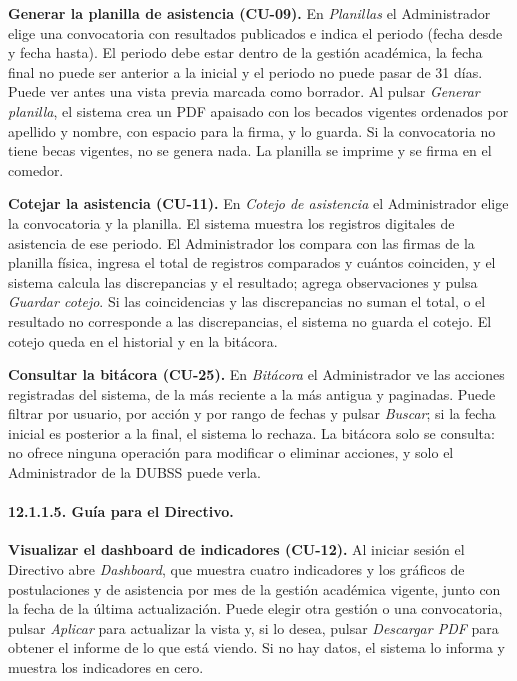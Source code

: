 \textbf{Generar la planilla de asistencia (CU-09).} En \textit{Planillas} el Administrador elige una convocatoria con resultados publicados e indica el periodo (fecha desde y fecha hasta). El periodo debe estar dentro de la gestión académica, la fecha final no puede ser anterior a la inicial y el periodo no puede pasar de 31 días. Puede ver antes una vista previa marcada como borrador. Al pulsar \textit{Generar planilla}, el sistema crea un PDF apaisado con los becados vigentes ordenados por apellido y nombre, con espacio para la firma, y lo guarda. Si la convocatoria no tiene becas vigentes, no se genera nada. La planilla se imprime y se firma en el comedor.\par

\textbf{Cotejar la asistencia (CU-11).} En \textit{Cotejo de asistencia} el Administrador elige la convocatoria y la planilla. El sistema muestra los registros digitales de asistencia de ese periodo. El Administrador los compara con las firmas de la planilla física, ingresa el total de registros comparados y cuántos coinciden, y el sistema calcula las discrepancias y el resultado; agrega observaciones y pulsa \textit{Guardar cotejo}. Si las coincidencias y las discrepancias no suman el total, o el resultado no corresponde a las discrepancias, el sistema no guarda el cotejo. El cotejo queda en el historial y en la bitácora.\par

\textbf{Consultar la bitácora (CU-25).} En \textit{Bitácora} el Administrador ve las acciones registradas del sistema, de la más reciente a la más antigua y paginadas. Puede filtrar por usuario, por acción y por rango de fechas y pulsar \textit{Buscar}; si la fecha inicial es posterior a la final, el sistema lo rechaza. La bitácora solo se consulta: no ofrece ninguna operación para modificar o eliminar acciones, y solo el Administrador de la DUBSS puede verla.\par

\paragraph{12.1.1.5. Guía para el Directivo.}

\textbf{Visualizar el dashboard de indicadores (CU-12).} Al iniciar sesión el Directivo abre \textit{Dashboard}, que muestra cuatro indicadores y los gráficos de postulaciones y de asistencia por mes de la gestión académica vigente, junto con la fecha de la última actualización. Puede elegir otra gestión o una convocatoria, pulsar \textit{Aplicar} para actualizar la vista y, si lo desea, pulsar \textit{Descargar PDF} para obtener el informe de lo que está viendo. Si no hay datos, el sistema lo informa y muestra los indicadores en cero.

